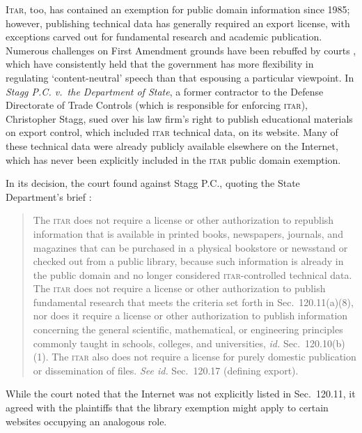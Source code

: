 \documentclass[12pt]{olfmemo}
\begin{document}
\textsc{Itar}, too, has contained an exemption for public domain information since 1985; however, publishing technical data has generally required an export license, with exceptions carved out for fundamental research and academic publication. Numerous challenges on First Amendment grounds have been rebuffed by courts \citep{Edler1978,Posey1989,Mak2012,StaggPC2019}, which have consistently held that the government has more flexibility in regulating `content-neutral' speech than that espousing a particular viewpoint. In \textit{Stagg P.C. v.\ the Department of State}, a former contractor to the Defense Directorate of Trade Controls (which is responsible for enforcing \textsc{itar}), Christopher Stagg, sued over his law firm's right to publish educational materials on export control, which included \textsc{itar} technical data, on its website. Many of these technical data were already publicly available elsewhere on the Internet, which has never been explicitly included in the \textsc{itar} public domain exemption.

In its decision, the court found against Stagg P.C., quoting the State Department's brief \citep{StaggPC2019}:
\begin{quote}
The \textsc{itar} does not require a license or other authorization to republish information that is available in printed books, newspapers, journals, and magazines that can be purchased in a physical bookstore or newsstand or checked out from a public library, because such information is already in the public domain and no longer considered \textsc{itar}-controlled technical data. The \textsc{itar} does not require a license or other authorization to publish fundamental research that meets the criteria set forth in Sec.~120.11(a)(8), nor does it require a license or other authorization to publish information concerning the general scientific, mathematical, or engineering principles commonly taught in schools, colleges, and universities, \textit{id.} Sec.~120.10(b)(1). The \textsc{itar} also does not require a license for purely domestic publication or dissemination of files. \textit{See id.} Sec.~120.17 (defining export).
\end{quote}
While the court noted that the Internet was not explicitly listed in Sec.~120.11, it agreed with the plaintiffs that the library exemption might apply to certain websites occupying an analogous role.
\end{document}
